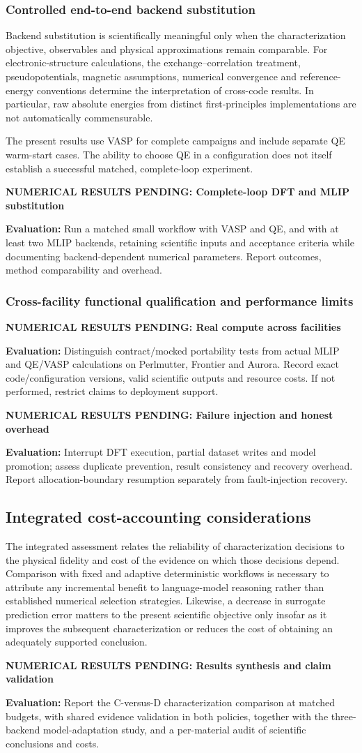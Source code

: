 \documentclass[11pt,a4paper]{article}
\newcommand{\newexperiment}[2]{\par\medskip\noindent\begingroup\color{red!80!black}\textbf{NUMERICAL RESULTS PENDING: #1}\par\noindent\textbf{Evaluation:} #2\par\endgroup\medskip}
\begin{document}
\subsubsection{Controlled end-to-end backend substitution}
Backend substitution is scientifically meaningful only when the characterization objective, observables and physical approximations remain comparable. For electronic-structure calculations, the exchange--correlation treatment, pseudopotentials, magnetic assumptions, numerical convergence and reference-energy conventions determine the interpretation of cross-code results. In particular, raw absolute energies from distinct first-principles implementations are not automatically commensurable.

The present results use VASP for complete campaigns and include separate QE warm-start cases. The ability to choose QE in a configuration does not itself establish a successful matched, complete-loop experiment.
\newexperiment{Complete-loop DFT and MLIP substitution}{Run a matched small workflow with VASP and QE, and with at least two MLIP backends, retaining scientific inputs and acceptance criteria while documenting backend-dependent numerical parameters. Report outcomes, method comparability and overhead.}

\subsubsection{Cross-facility functional qualification and performance limits}
\newexperiment{Real compute across facilities}{Distinguish contract/mocked portability tests from actual MLIP and QE/VASP calculations on Perlmutter, Frontier and Aurora. Record exact code/configuration versions, valid scientific outputs and resource costs. If not performed, restrict claims to deployment support.}
\newexperiment{Failure injection and honest overhead}{Interrupt DFT execution, partial dataset writes and model promotion; assess duplicate prevention, result consistency and recovery overhead. Report allocation-boundary resumption separately from fault-injection recovery.}
\subsection{Integrated cost-accounting considerations}
\label{sec:results_synthesis}
The integrated assessment relates the reliability of characterization decisions to the physical fidelity and cost of the evidence on which those decisions depend. Comparison with fixed and adaptive deterministic workflows is necessary to attribute any incremental benefit to language-model reasoning rather than established numerical selection strategies. Likewise, a decrease in surrogate prediction error matters to the present scientific objective only insofar as it improves the subsequent characterization or reduces the cost of obtaining an adequately supported conclusion.
\newexperiment{Results synthesis and claim validation}{Report the C-versus-D characterization comparison at matched budgets, with shared evidence validation in both policies, together with the three-backend model-adaptation study, and a per-material audit of scientific conclusions and costs.}




\end{document}

